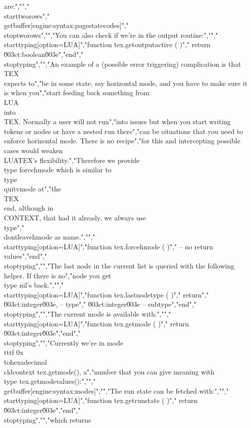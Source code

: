 are:","","\\starttworows","\\getbuffer[engine:syntax:pagestatecodes]","\\stoptworows","","You can also check if we're in the output routine:","","\\starttyping[option=LUA]","function tex.getoutputactive ( )","    return \u003ct:boolean\u003e","end","\\stoptyping","","An example of a (possible error triggering) complication is that \\TEX\\ expects to","be in some state, say horizontal mode, and you have to make sure it is when you","start feeding back something from \\LUA\\ into \\TEX. Normally a user will not run","into issues but when you start writing tokens or nodes or have a nested run there","can be situations that you need to enforce horizontal mode. There is no recipe","for this and intercepting possible cases would weaken \\LUATEX's flexibility.","Therefore we provide \\type {forcehmode} which is similar to \\type {\\quitvmode} at","the \\TEX\\ end, although in \\CONTEXT, that had it already, we always use \\type","{\\dontleavehmode} as name.","","\\starttyping[option=LUA]","function tex.forcehmode ( )","    -- no return values","end","\\stoptyping","","The last node in the current list is queried with the following helper. If there is no","node you get \\type {nil}'s back.","","\\starttyping[option=LUA]","function tex.lastnodetype ( )","    return","        \u003ct:integer\u003e, -- type","        \u003ct:integer\u003e  -- subtype","end","\\stoptyping","","The current mode is available with:","","\\starttyping[option=LUA]","function tex.getmode ( )","    return \u003ct:integer\u003e","end","\\stoptyping","","Currently we're in mode {\\tttf 0x\\tohexadecimal\\cldcontext {tex.getmode()}}, a","number that you can give meaning with \\type {tex.getmodevalues()}:","","\\getbuffer[engine:syntax:modes]","","The run state can be fetched with:","","\\starttyping[option=LUA]","function tex.getrunstate ( )","    return \u003ct:integer\u003e","end","\\stoptyping","","which returns 